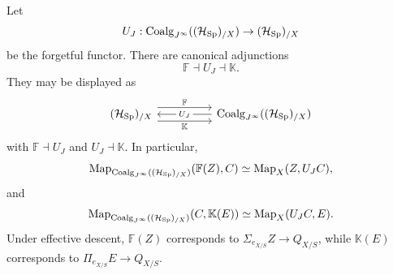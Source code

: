 \begin{theorem}
\label{thm:free-forgetful-cofree}
Let
\[
  U_J:\operatorname{Coalg}_{J^\infty}((\mathcal H_{\operatorname{Sp}})_{/X})\to(\mathcal H_{\operatorname{Sp}})_{/X}
\]
be the forgetful functor. There are canonical adjunctions
\[
  \mathbb F\dashv U_J\dashv\mathbb K.
\]
They may be displayed as
\[
\begin{tikzcd}[column sep=huge]
(\mathcal H_{\Sp})_{/X}
  \ar[r,shift left=1.4ex,"\mathbb F"]
  \ar[r,shift right=1.4ex,"\mathbb K"']
&
\operatorname{Coalg}_{J^\infty}((\mathcal H_{\Sp})_{/X})
  \ar[l,"U_J" description]
\end{tikzcd}
\]
with \(\mathbb F\dashv U_J\) and \(U_J\dashv\mathbb K\).
In particular,
\[
  \operatorname{Map}_{\operatorname{Coalg}_{J^\infty}((\mathcal H_{\operatorname{Sp}})_{/X})}(\mathbb F(Z),C)
  \simeq
  \operatorname{Map}_X(Z,U_JC),
\]
and
\[
  \operatorname{Map}_{\operatorname{Coalg}_{J^\infty}((\mathcal H_{\operatorname{Sp}})_{/X})}(C,\mathbb K(E))
  \simeq
  \operatorname{Map}_X(U_JC,E).
\]
Under effective descent, \(\mathbb F(Z)\) corresponds to
\(\Sigma_{e_{X/S}} Z\to Q_{X/S}\), while \(\mathbb K(E)\) corresponds to
\(\Pi_{e_{X/S}} E\to Q_{X/S}\).
\end{theorem}

